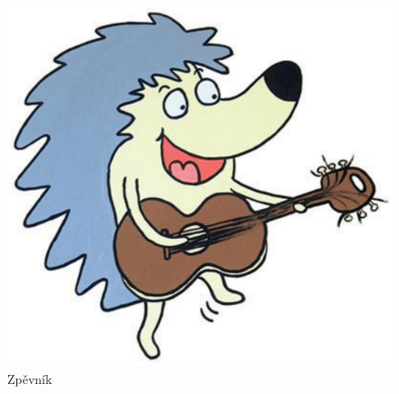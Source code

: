 \documentclass[a5paper, 10pt, onecolumn]{article}
\begin{document}



\begin{titlepage}
	\begin{figure}[h!]
	\begin{center}
		\includegraphics[scale=0.65]{jezek.png}\\
		\vspace{5em}
		{\fontsize{80}{90}\Fontskrivan\selectfont Zpěvník}
	\end{center}
	\end{figure}		
\end{titlepage}
\end{document}
